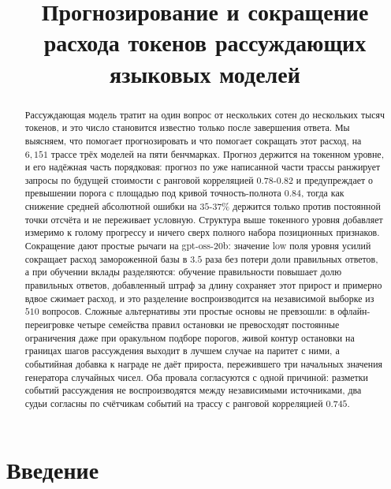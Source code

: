 \documentclass[11pt]{article}
\title{Прогнозирование и сокращение расхода токенов рассуждающих языковых моделей}
\author{}
\date{}
\begin{document}
\maketitle

\begin{abstract}
Рассуждающая модель тратит на один вопрос от нескольких сотен до нескольких тысяч токенов, и это число становится известно только после завершения ответа. Мы выясняем, что помогает прогнозировать и что помогает сокращать этот расход, на $6{,}151$ трассе трёх моделей на пяти бенчмарках. Прогноз держится на токенном уровне, и его надёжная часть порядковая: прогноз по уже написанной части трассы ранжирует запросы по будущей стоимости с ранговой корреляцией $0.78$-$0.82$ и предупреждает о превышении порога с площадью под кривой точность-полнота $0.84$, тогда как снижение средней абсолютной ошибки на $35$-$37\%$ держится только против постоянной точки отсчёта и не переживает условную. Структура выше токенного уровня добавляет измеримо к голому прогрессу и ничего сверх полного набора позиционных признаков. Сокращение дают простые рычаги на gpt-oss-20b: значение low поля уровня усилий сокращает расход замороженной базы в $3.5$ раза без потери доли правильных ответов, а при обучении вклады разделяются: обучение правильности повышает долю правильных ответов, добавленный штраф за длину сохраняет этот прирост и примерно вдвое сжимает расход, и это разделение воспроизводится на независимой выборке из $510$ вопросов. Сложные альтернативы эти простые основы не превзошли: в офлайн-переигровке четыре семейства правил остановки не превосходят постоянные ограничения даже при оракульном подборе порогов, живой контур остановки на границах шагов рассуждения выходит в лучшем случае на паритет с ними, а событийная добавка к награде не даёт прироста, пережившего три начальных значения генератора случайных чисел. Оба провала согласуются с одной причиной: разметки событий рассуждения не воспроизводятся между независимыми источниками, два судьи согласны по счётчикам событий на трассу с ранговой корреляцией $0.745$.
\end{abstract}

\section{Введение}
\end{document}
